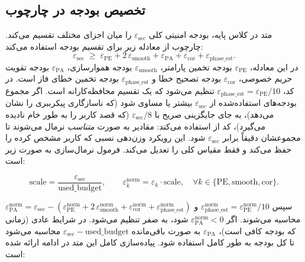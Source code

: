 \subsection{تخصیص بودجه \lr{$\varepsilon$} در چارچوب }

متد  در کلاس پایه، بودجه امنیتی کلی $\varepsilon_{\text{sec}}$ را میان اجزای مختلف تقسیم می‌کند. چارچوب  از معادله زیر برای تقسیم بودجه استفاده می‌کند:
\begin{equation}
	\varepsilon_{\text{sec}} \;\ge\; \varepsilon_{\text{PE}} + 2\,\varepsilon_{\text{smooth}} + \varepsilon_{\text{PA}} + \varepsilon_{\text{cor}} + \varepsilon_{\text{phase\_est}}.
\end{equation}
در این معادله، $\varepsilon_{\text{PE}}$ بودجه تخمین پارامتر، $\varepsilon_{\text{smooth}}$ بودجه هموارسازی، $\varepsilon_{\text{PA}}$ بودجه تقویت حریم خصوصی، $\varepsilon_{\text{cor}}$ بودجه تصحیح خطا و $\varepsilon_{\text{phase\_est}}$ بودجه تخمین خطای فاز است. در کد، $\varepsilon_{\text{phase\_est}} = \varepsilon_{\text{PE}} / 10$ تنظیم می‌شود که یک تقسیم محافظه‌کارانه است. اگر مجموع بودجه‌های استفاده‌شده از $\varepsilon_{\text{sec}}$ بیشتر یا مساوی شود (که ناسازگاری پیکرببری را نشان می‌دهد)، به جای جایگزینی صریح با $\varepsilon_{\text{sec}}/8$ (که قصد کاربر را به طور خام نادیده می‌گیرد)، کد از  استفاده می‌کند: مقادیر به صورت \emph{متناسب} نرمال می‌شوند تا مجموعشان دقیقاً برابر $\varepsilon_{\text{sec}}$ شود. این رویکرد وزن‌دهی نسبی که کاربر مشخص کرده را حفظ می‌کند و فقط مقیاس کلی را تعدیل می‌کند. فرمول نرمال‌سازی به صورت زیر است:

\begin{equation}
	\text{scale} = \frac{\varepsilon_{\text{sec}}}{\text{used\_budget}}, \qquad \varepsilon_k^{\text{norm}} = \varepsilon_k \cdot \text{scale}, \quad \forall k \in \{\text{PE}, \text{smooth}, \text{cor}\}.
\end{equation}

سپس $\varepsilon_{\text{phase\_est}}^{\text{norm}} = \varepsilon_{\text{PE}}^{\text{norm}} / 10$ و $\varepsilon_{\text{PA}}^{\text{norm}} = \varepsilon_{\text{sec}} - (\varepsilon_{\text{PE}}^{\text{norm}} + 2\,\varepsilon_{\text{smooth}}^{\text{norm}} + \varepsilon_{\text{cor}}^{\text{norm}} + \varepsilon_{\text{phase\_est}}^{\text{norm}})$ محاسبه می‌شوند. اگر $\varepsilon_{\text{PA}}^{\text{norm}} < 0$ شود، به صفر تنظیم می‌شود. در شرایط عادی (زمانی که بودجه کافی است)، $\varepsilon_{\text{PA}}$ به صورت باقی‌مانده $\varepsilon_{\text{sec}} - \text{used\_budget}$ محاسبه می‌شود تا کل بودجه به طور کامل استفاده شود. پیاده‌سازی کامل این متد در ادامه ارائه شده است:

